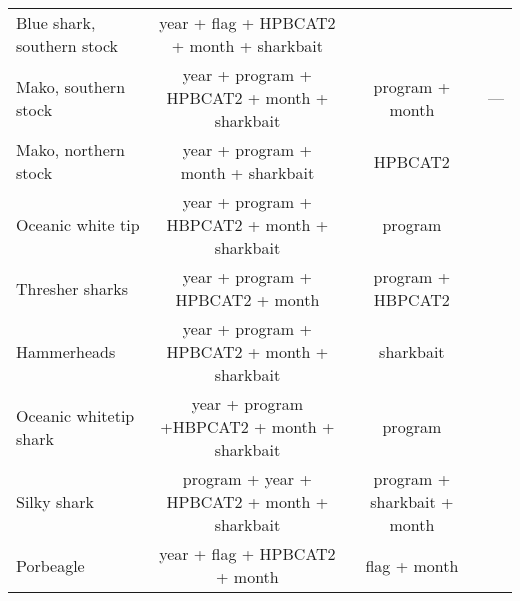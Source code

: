 \documentclass{SCreport}
\begin{document}
\begin{landscape}
\begin{table}[!h]
\begin{center}
\begin{tabular}{l|c|c|c}
Blue shark, southern stock & year + flag + HPBCAT2 + month + sharkbait & \\ 
Mako, southern stock & year + program + HPBCAT2 + month + sharkbait & program + month & ---\\
Mako, northern stock & year + program + month + sharkbait & HPBCAT2 \\
Oceanic white tip & year + program + HBPCAT2 + month + sharkbait & program \\
Thresher sharks& year + program + HPBCAT2 + month & program + HBPCAT2 \\
Hammerheads& year + program + HPBCAT2 + month + sharkbait & sharkbait \\
Oceanic whitetip shark& year + program +HBPCAT2 + month + sharkbait & program\\
Silky shark & program + year + HPBCAT2 + month + sharkbait & program + sharkbait + month\\
Porbeagle & year + flag + HPBCAT2 + month & flag + month\\ 

\end{tabular}
\end{center}
\end{table}
\end{landscape}


\BSHnorthaic
\BSHsouthaic
\FALaic
\HHDaic
\MAKnorthaic
\MAKsouthaic
\OCSaic
\PORaic
\THRaic
\end{document}
